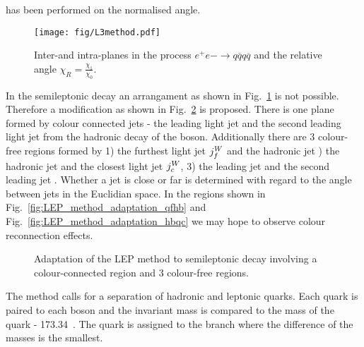 has been performed on the normalised angle. 

\begin{figure}[hbtp]
  \centering
  \texttt{[image: fig/L3method.pdf]}
  \caption{Inter-\PW and intra-\PW planes in the process $e^{+}e{-}\rightarrow q\overline{q}q\overline{q}$ and the relative angle $\chi_{R}=\frac{\chi_{1}}{\chi_{0}}$.}
  \label{fig:LEP_method}
\end{figure}

In the \ttbar semileptonic decay an arrangament as shown in Fig.~\ref{fig:LEP_method} is not possible. Therefore a modification as shown in Fig.~\ref{fig:LEP_method_adaptation} is proposed. There is one plane formed by colour connected jets - the leading light jet \leadingjet and the second leading light jet \scndleadingjet from the hadronic decay of the \PW boson. Additionally there are 3 colour-free regions formed by 1) the furthest light jet $j^{W}_{f}$ and the hadronic \cPqb jet ) the hadronic \cPqb jet \hadronicb and the closest light jet $j^{W}_{c}$, 3) the leading \cPqb jet \leadingb and the second leading \cPqb jet \scndleadingb. Whether a jet is close or far is determined with regard to the angle between jets in the Euclidian space. In the regions shown in Fig.~\ref{fig:LEP_method_adaptation_qfhb} and Fig.~\ref{fig:LEP_method_adaptation_hbqc} we may hope to observe colour reconnection effects.

\begin{figure}[hbtp]
  \centering
  \def\twidth{0.24}
  \hfil
 \hfil
  \hfil
  \caption{Adaptation of the LEP method to \ttbar semileptonic decay involving a colour-connected region and 3 colour-free regions.}
  \label{fig:LEP_method_adaptation}
\end{figure}

The method calls for a separation of hadronic and leptonic \cPqb quarks. Each \cPqb quark is paired to each \PW boson and the invariant mass is compared to the mass of the \cPqt quark - 173.34~\GeV. The \cPqb quark is assigned to the branch where the difference of the masses is the smallest. 
